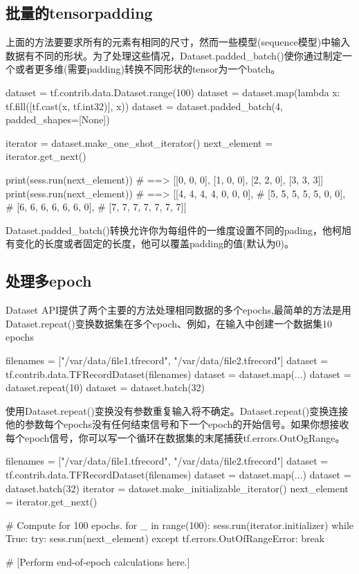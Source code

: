 \subsection{批量的tensorpadding}
上面的方法要要求所有的元素有相同的尺寸，然而一些模型(sequence模型)中输入数据有不同的形状。为了处理这些情况，Dataset.padded\_batch()使你通过制定一个或者更多维(需要padding)转换不同形状的tensor为一个batch。
\begin{python}
dataset = tf.contrib.data.Dataset.range(100)
dataset = dataset.map(lambda x: tf.fill([tf.cast(x, tf.int32)], x))
dataset = dataset.padded_batch(4, padded_shapes=[None])

iterator = dataset.make_one_shot_iterator()
next_element = iterator.get_next()

print(sess.run(next_element))  # ==> [[0, 0, 0], [1, 0, 0], [2, 2, 0], [3, 3, 3]]
print(sess.run(next_element))  # ==> [[4, 4, 4, 4, 0, 0, 0],
                               #      [5, 5, 5, 5, 5, 0, 0],
                               #      [6, 6, 6, 6, 6, 6, 0],
                               #      [7, 7, 7, 7, 7, 7, 7]]
\end{python}
Dataset.padded\_batch()转换允许你为每组件的一维度设置不同的pading，他柯旭有变化的长度或者固定的长度，他可以覆盖padding的值(默认为0)。
\subsection{处理多epoch}
Dataset API提供了两个主要的方法处理相同数据的多个epochs,最简单的方法是用Dataset.repeat()变换数据集在多个epoch、例如，在输入中创建一个数据集10 epochs
\begin{python}
filenames = ["/var/data/file1.tfrecord", "/var/data/file2.tfrecord"]
dataset = tf.contrib.data.TFRecordDataset(filenames)
dataset = dataset.map(...)
dataset = dataset.repeat(10)
dataset = dataset.batch(32)
\end{python}
使用Dataset.repeat()变换没有参数重复输入将不确定。Dataset.repeat()变换连接他的参数每个epochs没有任何结束信号和下一个epoch的开始信号。如果你想接收每个epoch信号，你可以写一个循环在数据集的末尾捕获tf.errors.OutOgRange。
\begin{python}
filenames = ["/var/data/file1.tfrecord", "/var/data/file2.tfrecord"]
dataset = tf.contrib.data.TFRecordDataset(filenames)
dataset = dataset.map(...)
dataset = dataset.batch(32)
iterator = dataset.make_initializable_iterator()
next_element = iterator.get_next()

# Compute for 100 epochs.
for _ in range(100):
    sess.run(iterator.initializer)
    while True:
    try:
        sess.run(next_element)
    except tf.errors.OutOfRangeError:
        break

  # [Perform end-of-epoch calculations here.]
\end{python}
